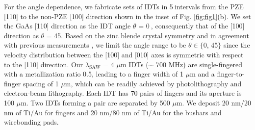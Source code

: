 \documentclass[aps,prb,amsmath,amssymb,footinbib,showpacs,superscriptaddress]{revtex4-1}%
\begin{document}
For the angle dependence, we fabricate sets of IDTs in 5\textdegree$\>$intervals from the PZE [110] to the non-PZE [100] direction shown in the inset of Fig. \ref{fig:fig1}(b). We set the GaAs [110] direction as the IDT angle $\theta$ = 0\textdegree$\>$, consequently that of the [100] direction as $\theta$ = 45\textdegree. Based on the zinc blende crystal symmetry and in agreement with previous measurements \cite{Flannery1999, Hunt1986}, we limit the angle range to be  $\theta \in \{0$\textdegree, 45\textdegree$\}$ since the velocity distribution between the [100] and [010] axes is symmetric with respect to the [110] direction. Our $\lambda_\text{SAW}$ = 4 $\mu$m IDTs ($\sim$ 700 MHz) are single-fingered with a metallization ratio 0.5, leading to a finger width of 1 $\mu$m and a finger-to-finger spacing of 1 $\mu$m, which can be readily achieved by photolithography and electron-beam lithography. Each IDT has 70 pairs of fingers and its aperture is 100 $\mu$m. Two IDTs forming a pair are separated by 500 $\mu$m. We deposit 20 nm/20 nm of Ti/Au for fingers and 20 nm/80 nm of Ti/Au for the busbars and wirebonding pads. 
\end{document}
